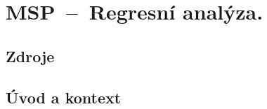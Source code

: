 

\graphicspath{{msp/regresni_analyza/figures}}


\chapter{MSP~--~Regresní analýza.}


\section{Zdroje}

\begin{compactitem}
    \item {}
\end{compactitem}


\section{Úvod a kontext}

